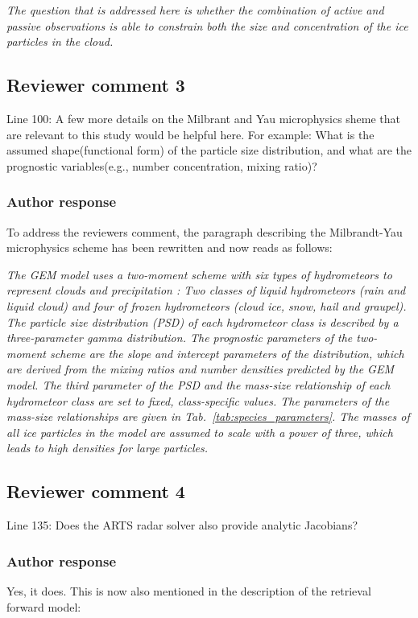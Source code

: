 \documentclass[11pt]{scrartcl}
\begin{document}
\begin{itemize}
\textit{The question that is addressed here is whether the combination of active
  and passive observations is able to constrain both the size and concentration
  of the ice particles in the cloud.}

\subsection*{Reviewer comment 3}

Line 100: A few more details on the Milbrant and Yau microphysics sheme that are relevant to this study would be helpful here. For example: What is the assumed shape(functional form) of the particle size distribution, and what are the prognostic variables(e.g., number concentration, mixing ratio)?

\subsubsection*{Author response}

To address the reviewers comment, the paragraph describing the Milbrandt-Yau microphysics scheme
has been rewritten and now reads as follows:

\textit{
The GEM model uses a two-moment scheme with six types of hydrometeors to
represent clouds and precipitation \citep{milbrandtyau05}: Two classes of liquid
hydrometeors (rain and liquid cloud) and four of frozen hydrometeors (cloud ice,
snow, hail and graupel). The particle size distribution (PSD) of each
hydrometeor class is described by a three-parameter gamma distribution. The
prognostic parameters of the two-moment scheme are the slope and intercept
parameters of the distribution, which are derived from the mixing ratios and
number densities predicted by the GEM model. The third parameter of the PSD and
the mass-size relationship of each hydrometeor class are set to fixed,
class-specific values. The parameters of the mass-size relationships are given
in Tab.~\ref{tab:species_parameters}. The masses of all ice particles in the
model are assumed to scale with a power of three, which leads to high densities
for large particles.
  }

\subsection*{Reviewer comment 4}
Line 135: Does the ARTS radar solver also provide analytic Jacobians?

\subsubsection*{Author response}
Yes, it does. This is now also mentioned in the description of the retrieval forward model:


\end{itemize}
\end{document}
